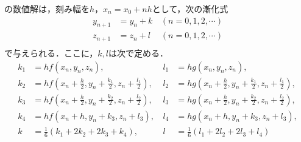 \documentclass[11pt,dvipdfmx]{jsarticle}
\begin{document}
の数値解は，刻み幅を\(h\)，\(x_n=x_0+nh\)として，次の漸化式 \[
\begin{aligned}
y_{n+1} & = y_n +k &\, (n=0,1,2,\cdots) \\
z_{n+1} & = z_n +l &\, (n=0,1,2,\cdots) \\
\end{aligned}
\] で与えられる．ここに，\(k,l\)は次で定める． \[
\begin{aligned}
k_1 &= hf(x_n,y_n,z_n), \,
&l_1 &= hg(x_n,y_n,z_n), \\
k_2 &= hf(x_n+\frac{h}{2}, y_n+\frac{k_1}{2}, z_n+\frac{l_1}{2}), \,
&l_2 &= hg(x_n+\frac{h}{2}, y_n+\frac{k_1}{2}, z_n+\frac{l_1}{2}), \\
k_3 &= hf(x_n+\frac{h}{2}, y_n+\frac{k_2}{2}, z_n+\frac{l_2}{2}), \,
&l_3 &= hg(x_n+\frac{h}{2}, y_n+\frac{k_2}{2}, z_n+\frac{l_2}{2}), \\
k_4 &= hf(x_n+h, y_n+k_3, z_n+l_3), \,
&l_4 &= hg(x_n+h, y_n+k_3, z_n+l_3), \\
k &= \frac{1}{6}(k_1+2k_2+2k_3+k_4), \,
&l &= \frac{1}{6}(l_1+2l_2+2l_3+l_4)
\end{aligned}
\]
\end{document}
